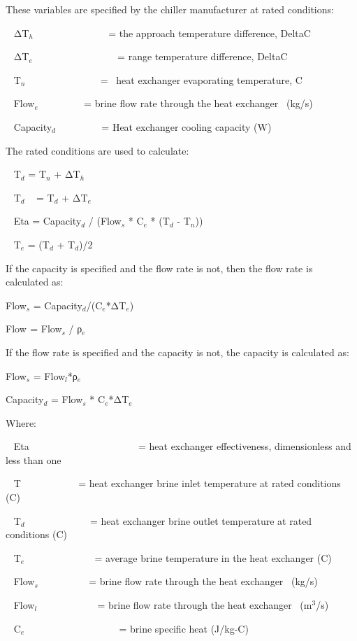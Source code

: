 These variables are specified by the chiller manufacturer at rated conditions:

~ ΔT\(_{h}\) ~~~~~~~~~~~~~~ = the approach temperature difference, DeltaC

~ ΔT\(_{e}\) ~~~~~~~~~~~~~~~~ = range temperature difference, DeltaC

~ T\(_{n}\) ~~~~~~~~~~~~~~ = ~heat exchanger evaporating temperature, C

~ Flow\(_{e}\) ~~~~~~~~ = brine flow rate through the heat exchanger~ (kg/s)

~ Capacity\(_{d}\) ~~~~~~~~ = Heat exchanger cooling capacity (W)

The rated conditions are used to calculate:

~ T\(_{d}\) = T\(_{n}\) + ΔT\(_{h}\)

~ T\(_{d}\) ~ = T\(_{d}\) + ΔT\(_{e}\)

~ Eta = Capacity\(_{d}\) / (Flow\(_{s}\) * C\(_{e}\) * (T\(_{d}\) - T\(_{n}\)))

~ T\(_{e}\) = (T\(_{d}\) + T\(_{d}\))/2

If the capacity is specified and the flow rate is not, then the flow rate is calculated as:

Flow\(_{s}\) = Capacity\(_{d}\)/(C\(_{e}\)*ΔT\(_{e}\))

Flow\(_{ }\) = Flow\(_{s}\) / ρ\(_{e}\)

If the flow rate is specified and the capacity is not, the capacity is calculated as:

Flow\(_{s}\) = Flow\(_{l}\)*ρ\(_{e}\)

Capacity\(_{d}\) = Flow\(_{s}\) * C\(_{e}\)*ΔT\(_{e}\)

Where:

~ Eta~~ ~~~~~~~~~~~~~~~~~~~ = heat exchanger effectiveness, dimensionless and less than one

~ T\(_{ }\)~~~~~~~~~~~ = heat exchanger brine inlet temperature at rated conditions (C)

~ T\(_{d}\) ~~~~~~~~~~~~ = heat exchanger brine outlet temperature at rated conditions (C)

~ T\(_{e}\)~~~ ~~~~~~~~~~ = average brine temperature in the heat exchanger (C)

~ Flow\(_{s}\) ~~~~~~~~~ = brine flow rate through the heat exchanger~ (kg/s)

~ Flow\(_{l}\)~~ ~~~~~~~~~ = brine flow rate through the heat exchanger~ (m\(^{3}\)/s)

~ C\(_{e}\)~~~~~~~~~~ ~~~~~~~~ = brine specific heat (J/kg-C)

